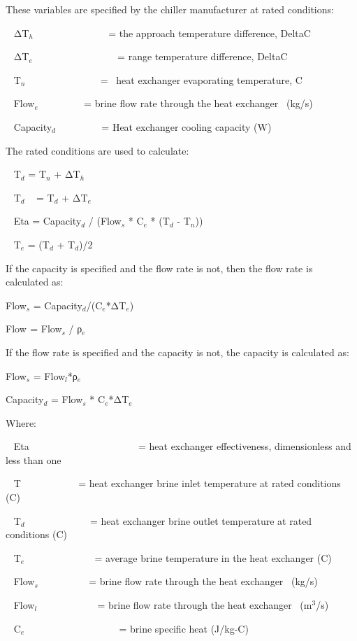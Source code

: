 These variables are specified by the chiller manufacturer at rated conditions:

~ ΔT\(_{h}\) ~~~~~~~~~~~~~~ = the approach temperature difference, DeltaC

~ ΔT\(_{e}\) ~~~~~~~~~~~~~~~~ = range temperature difference, DeltaC

~ T\(_{n}\) ~~~~~~~~~~~~~~ = ~heat exchanger evaporating temperature, C

~ Flow\(_{e}\) ~~~~~~~~ = brine flow rate through the heat exchanger~ (kg/s)

~ Capacity\(_{d}\) ~~~~~~~~ = Heat exchanger cooling capacity (W)

The rated conditions are used to calculate:

~ T\(_{d}\) = T\(_{n}\) + ΔT\(_{h}\)

~ T\(_{d}\) ~ = T\(_{d}\) + ΔT\(_{e}\)

~ Eta = Capacity\(_{d}\) / (Flow\(_{s}\) * C\(_{e}\) * (T\(_{d}\) - T\(_{n}\)))

~ T\(_{e}\) = (T\(_{d}\) + T\(_{d}\))/2

If the capacity is specified and the flow rate is not, then the flow rate is calculated as:

Flow\(_{s}\) = Capacity\(_{d}\)/(C\(_{e}\)*ΔT\(_{e}\))

Flow\(_{ }\) = Flow\(_{s}\) / ρ\(_{e}\)

If the flow rate is specified and the capacity is not, the capacity is calculated as:

Flow\(_{s}\) = Flow\(_{l}\)*ρ\(_{e}\)

Capacity\(_{d}\) = Flow\(_{s}\) * C\(_{e}\)*ΔT\(_{e}\)

Where:

~ Eta~~ ~~~~~~~~~~~~~~~~~~~ = heat exchanger effectiveness, dimensionless and less than one

~ T\(_{ }\)~~~~~~~~~~~ = heat exchanger brine inlet temperature at rated conditions (C)

~ T\(_{d}\) ~~~~~~~~~~~~ = heat exchanger brine outlet temperature at rated conditions (C)

~ T\(_{e}\)~~~ ~~~~~~~~~~ = average brine temperature in the heat exchanger (C)

~ Flow\(_{s}\) ~~~~~~~~~ = brine flow rate through the heat exchanger~ (kg/s)

~ Flow\(_{l}\)~~ ~~~~~~~~~ = brine flow rate through the heat exchanger~ (m\(^{3}\)/s)

~ C\(_{e}\)~~~~~~~~~~ ~~~~~~~~ = brine specific heat (J/kg-C)

